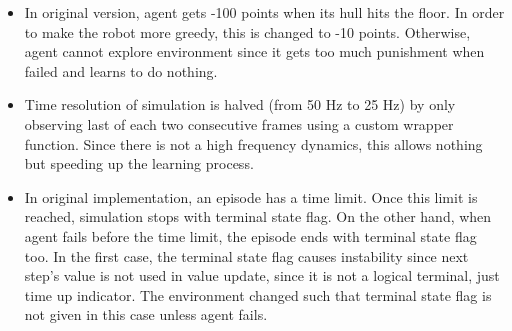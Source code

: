 \begin{itemize}
	\item In original version, agent gets -100 points when its hull hits the floor. 
	In order to make the robot more greedy, this is changed to -10 points. 
	Otherwise, agent cannot explore environment since it gets too much punishment when failed and learns to do nothing.
	\item Time resolution of simulation is halved (from 50 Hz to 25 Hz) by only observing last of each two consecutive frames using a custom wrapper function. 
	Since there is not a high frequency dynamics, this allows nothing but speeding up the learning process.
	\item In original implementation, an episode has a time limit. 
	Once this limit is reached, simulation stops with terminal state flag. 
	On the other hand, when agent fails before the time limit, the episode ends with terminal state flag too. 
	In the first case, the terminal state flag causes instability since next step's value is not used in value update, since it is not a logical terminal, just time up indicator.
	The environment changed such that terminal state flag is not given in this case unless agent fails. 
\end{itemize}


